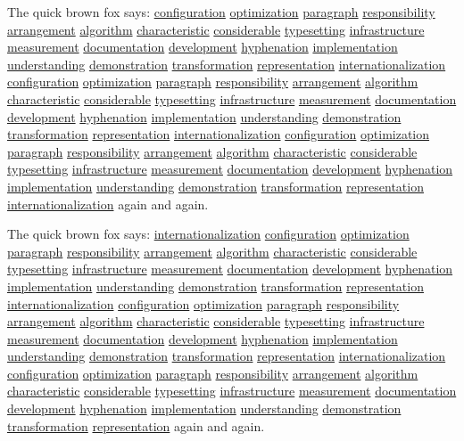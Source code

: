 \documentclass{article}
\begin{document}
The quick brown fox says: \underline{configuration} \underline{optimization} \underline{paragraph} \underline{responsibility} \underline{arrangement} \underline{algorithm} \underline{characteristic} \underline{considerable} \underline{typesetting} \underline{infrastructure} \underline{measurement} \underline{documentation} \underline{development} \underline{hyphenation} \underline{implementation} \underline{understanding} \underline{demonstration} \underline{transformation} \underline{representation} \underline{internationalization} \underline{configuration} \underline{optimization} \underline{paragraph} \underline{responsibility} \underline{arrangement} \underline{algorithm} \underline{characteristic} \underline{considerable} \underline{typesetting} \underline{infrastructure} \underline{measurement} \underline{documentation} \underline{development} \underline{hyphenation} \underline{implementation} \underline{understanding} \underline{demonstration} \underline{transformation} \underline{representation} \underline{internationalization} \underline{configuration} \underline{optimization} \underline{paragraph} \underline{responsibility} \underline{arrangement} \underline{algorithm} \underline{characteristic} \underline{considerable} \underline{typesetting} \underline{infrastructure} \underline{measurement} \underline{documentation} \underline{development} \underline{hyphenation} \underline{implementation} \underline{understanding} \underline{demonstration} \underline{transformation} \underline{representation} \underline{internationalization} again and again.

The quick brown fox says: \underline{internationalization} \underline{configuration} \underline{optimization} \underline{paragraph} \underline{responsibility} \underline{arrangement} \underline{algorithm} \underline{characteristic} \underline{considerable} \underline{typesetting} \underline{infrastructure} \underline{measurement} \underline{documentation} \underline{development} \underline{hyphenation} \underline{implementation} \underline{understanding} \underline{demonstration} \underline{transformation} \underline{representation} \underline{internationalization} \underline{configuration} \underline{optimization} \underline{paragraph} \underline{responsibility} \underline{arrangement} \underline{algorithm} \underline{characteristic} \underline{considerable} \underline{typesetting} \underline{infrastructure} \underline{measurement} \underline{documentation} \underline{development} \underline{hyphenation} \underline{implementation} \underline{understanding} \underline{demonstration} \underline{transformation} \underline{representation} \underline{internationalization} \underline{configuration} \underline{optimization} \underline{paragraph} \underline{responsibility} \underline{arrangement} \underline{algorithm} \underline{characteristic} \underline{considerable} \underline{typesetting} \underline{infrastructure} \underline{measurement} \underline{documentation} \underline{development} \underline{hyphenation} \underline{implementation} \underline{understanding} \underline{demonstration} \underline{transformation} \underline{representation} again and again.
\end{document}
